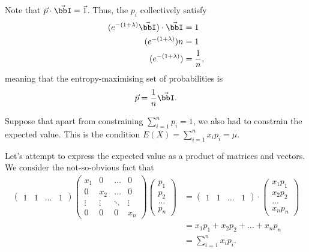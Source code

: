\documentclass[a4paper, 12pt,oneside,openany]{book}
\begin{document}
Note that $\vec{p} \cdot \vec{\bbI} = \vec{1}$. Thus, the $p_i$ collectively satisfy \begin{align*} (e^{-(1+\lambda)} \vec{\bbI}) \cdot \vec{\bbI} &=1 \\ (e^{-(1+\lambda)})n&=1 \\ (e^{-(1+\lambda)})&= \frac{1}{n}, \end{align*} meaning that the entropy-maximising set of probabilities is $$\vec{p} = \frac{1}{n} \vec{\bbI}.$$


Suppose that apart from constraining $\sum\limits_{i=1}^n p_i=1$, we also had to constrain the expected value. This is the condition $E(X)=\sum \limits_{i=1}^n x_i p_i = \mu$.

Let's attempt to express the expected value as a product of matrices and vectors. We consider the not-so-obvious fact that \begin{align*}\begin{pmatrix} 1 & 1 & \dots & 1 \end{pmatrix} \begin{pmatrix} x_1 & 0  & \dots & 0 \\ 0 & x_2 & \dots & 0 \\ \vdots & \vdots & \ddots & \vdots \\ 0 & 0 & 0 & x_n \end{pmatrix} \begin{pmatrix} p_1 \\ p_2 \\ \dots \\ p_n \end{pmatrix} &= \begin{pmatrix} 1 & 1 & \dots & 1 \end{pmatrix} \cdot \begin{pmatrix} x_1p_1 \\ x_2p_2 \\ \dots \\ x_np_n \end{pmatrix} \\ &= x_1p_1+x_2p_2+\dots+x_np_n \\ &= \sum\limits_{i=1}^n x_ip_i. \end{align*}
\end{document}
